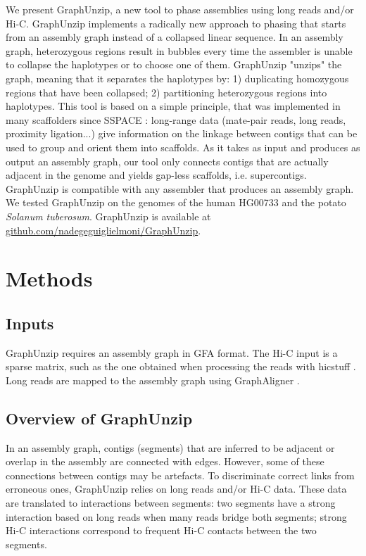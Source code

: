 We present GraphUnzip, a new tool to phase assemblies using long reads and/or Hi-C. GraphUnzip implements a radically new approach to phasing that starts from an assembly graph instead of a collapsed linear sequence. In an assembly graph, heterozygous regions result in bubbles every time the assembler is unable to collapse the haplotypes or to choose one of them. GraphUnzip "unzips" the graph, meaning that it separates the haplotypes by: 1) duplicating homozygous regions that have been collapsed; 2) partitioning heterozygous regions into haplotypes. This tool is based on a simple principle, that was implemented in many scaffolders since SSPACE \cite{sspace}: long-range data (mate-pair reads, long reads, proximity ligation...) give information on the linkage between contigs that can be used to group and orient them into scaffolds. As it takes as input and produces as output an assembly graph, our tool only connects contigs that are actually adjacent in the genome and yields gap-less scaffolds, i.e. supercontigs. GraphUnzip is compatible with any assembler that produces an assembly graph. We tested GraphUnzip on the genomes of the human HG00733 and the potato \textit{Solanum tuberosum}. GraphUnzip is available at \href{https://github.com/nadegeguiglielmoni/GraphUnzip}{github.com/nadegeguiglielmoni/GraphUnzip}. \\

\section{Methods}

\subsection{Inputs}

GraphUnzip requires an assembly graph in GFA format. The Hi-C input is a sparse matrix, such as the one obtained when processing the reads with hicstuff \cite{hicstuff}. Long reads are mapped to the assembly graph using GraphAligner \cite{graphaligner}.

\subsection{Overview of GraphUnzip}

In an assembly graph, contigs (segments) that are inferred to be adjacent or overlap in the assembly are connected with edges. However, some of these connections between contigs may be artefacts. To discriminate correct links from erroneous ones, GraphUnzip relies on long reads and/or Hi-C data. These data are translated to interactions between segments: two segments have a strong interaction based on long reads when many reads bridge both segments; strong Hi-C interactions correspond to frequent Hi-C contacts between the two segments. \\


